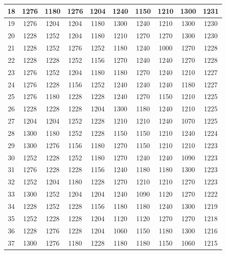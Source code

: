 \documentclass{article}
\begin{document}
\begin{table}[H]
\begin{tabular}{c|c|c|c|c|c|c|c|c|c|}
\multicolumn{1}{|c|}{18}  & 1276 & 1180 & 1276 & 1204 & 1240 & 1150 & 1210 & 1300 & 1231 \\ \hline
\multicolumn{1}{|c|}{19}  & 1276 & 1204 & 1204 & 1180 & 1300 & 1240 & 1210 & 1300 & 1230 \\ \hline
\multicolumn{1}{|c|}{20}  & 1228 & 1252 & 1204 & 1180 & 1210 & 1270 & 1270 & 1300 & 1230 \\ \hline
\multicolumn{1}{|c|}{21}  & 1228 & 1252 & 1276 & 1252 & 1180 & 1240 & 1000 & 1270 & 1228 \\ \hline
\multicolumn{1}{|c|}{22}  & 1228 & 1228 & 1252 & 1156 & 1270 & 1240 & 1240 & 1270 & 1228 \\ \hline
\multicolumn{1}{|c|}{23}  & 1276 & 1252 & 1204 & 1180 & 1180 & 1270 & 1240 & 1210 & 1227 \\ \hline
\multicolumn{1}{|c|}{24}  & 1276 & 1228 & 1156 & 1252 & 1240 & 1240 & 1240 & 1180 & 1227 \\ \hline
\multicolumn{1}{|c|}{25}  & 1276 & 1180 & 1228 & 1228 & 1240 & 1270 & 1150 & 1210 & 1225 \\ \hline
\multicolumn{1}{|c|}{26}  & 1228 & 1228 & 1228 & 1204 & 1300 & 1180 & 1240 & 1210 & 1225 \\ \hline
\multicolumn{1}{|c|}{27}  & 1204 & 1204 & 1252 & 1228 & 1210 & 1210 & 1240 & 1070 & 1225 \\ \hline
\multicolumn{1}{|c|}{28}  & 1300 & 1180 & 1252 & 1228 & 1150 & 1150 & 1210 & 1240 & 1224 \\ \hline
\multicolumn{1}{|c|}{29}  & 1300 & 1276 & 1156 & 1180 & 1270 & 1150 & 1210 & 1210 & 1223 \\ \hline
\multicolumn{1}{|c|}{30}  & 1252 & 1228 & 1252 & 1180 & 1270 & 1240 & 1240 & 1090 & 1223 \\ \hline
\multicolumn{1}{|c|}{31}  & 1276 & 1228 & 1228 & 1156 & 1240 & 1180 & 1180 & 1300 & 1223 \\ \hline
\multicolumn{1}{|c|}{32}  & 1252 & 1204 & 1180 & 1228 & 1270 & 1210 & 1210 & 1270 & 1223 \\ \hline
\multicolumn{1}{|c|}{33}  & 1300 & 1252 & 1204 & 1204 & 1240 & 1090 & 1120 & 1270 & 1222 \\ \hline
\multicolumn{1}{|c|}{34}  & 1228 & 1252 & 1228 & 1156 & 1180 & 1180 & 1240 & 1300 & 1219 \\ \hline
\multicolumn{1}{|c|}{35}  & 1252 & 1228 & 1228 & 1204 & 1120 & 1120 & 1270 & 1270 & 1218 \\ \hline
\multicolumn{1}{|c|}{36}  & 1228 & 1276 & 1228 & 1204 & 1060 & 1150 & 1180 & 1300 & 1216 \\ \hline
\multicolumn{1}{|c|}{37}  & 1300 & 1276 & 1180 & 1228 & 1180 & 1180 & 1150 & 1060 & 1215 \\ \hline

\end{tabular}
\end{table}
\end{document}
